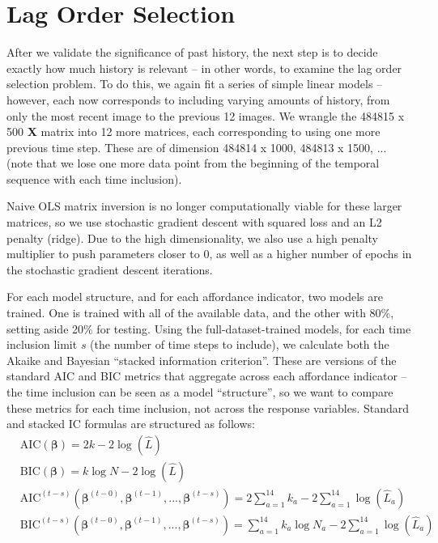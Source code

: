 \documentclass[11pt]{article}
\begin{document}
\section{Lag Order Selection}\label{sec:lag_order}
After we validate the significance of past history, the next step is to decide exactly how much history is relevant -- in other words, to examine the lag order selection problem.  To do this, we again fit a series of simple linear models -- however, each now corresponds to including varying amounts of history, from only the most recent image to the previous 12 images.  We wrangle the 484815 x 500 \textbf{X} matrix into 12 more matrices, each corresponding to using one more previous time step.  These are of dimension 484814 x 1000, 484813 x 1500, ... (note that we lose one more data point from the beginning of the temporal sequence with each time inclusion).\par
Naive OLS matrix inversion is no longer computationally viable for these larger matrices, so we use stochastic gradient descent with squared loss and an L2 penalty (ridge).  Due to the high dimensionality, we also use a high penalty multiplier to push parameters closer to 0, as well as a higher number of epochs in the stochastic gradient descent iterations.\par
For each model structure, and for each affordance indicator, two models are trained.  One is trained with all of the available data, and the other with 80\%, setting aside 20\% for testing.  Using the full-dataset-trained models, for each time inclusion limit $s$ (the number of time steps to include), we calculate both the Akaike and Bayesian ``stacked information criterion''.  These are versions of the standard AIC and BIC metrics that aggregate across each affordance indicator -- the time inclusion can be seen as a model ``structure'', so we want to compare these metrics for each time inclusion, not across the response variables.  Standard and stacked IC formulas are structured as follows:
\begin{align*}
&\text{AIC}(\boldsymbol\beta) = 2k - 2\log(\hat{L})\\
&\text{BIC}(\boldsymbol\beta) = k\log N - 2\log(\hat{L})\\
&\text{AIC}^{(t-s)}(\boldsymbol\beta^{(t-0)}, \boldsymbol\beta^{(t-1)}, ..., \boldsymbol\beta^{(t-s)}) = 2\sum_{a=1}^{14}k_a - 2\sum_{a=1}^{14}\log(\hat{L}_a)\\
&\text{BIC}^{(t-s)}(\boldsymbol\beta^{(t-0)}, \boldsymbol\beta^{(t-1)}, ..., \boldsymbol\beta^{(t-s)}) = \sum_{a=1}^{14}k_a\log N_a - 2\sum_{a=1}^{14}\log(\hat{L}_a)
\end{align*}
\end{document}
